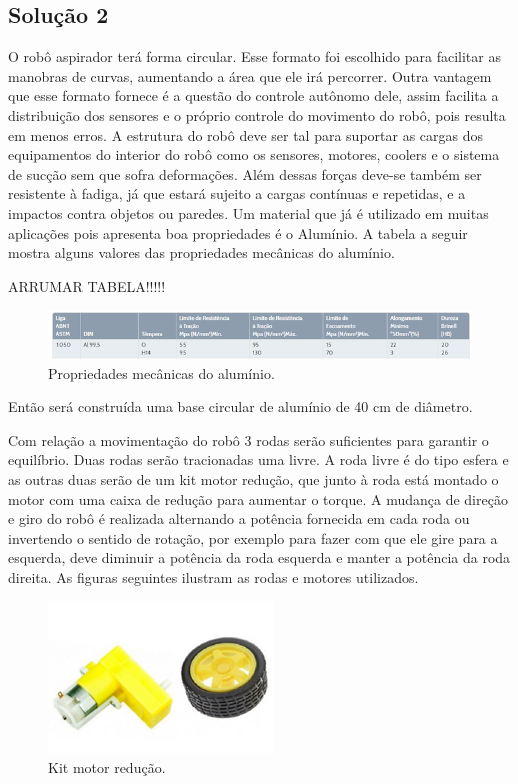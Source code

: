 		\subsection{Solução 2} %
		\label{sub:solução_2}
			
			O robô aspirador terá forma circular. Esse formato foi escolhido para facilitar as manobras de curvas, aumentando a área que ele irá percorrer. Outra vantagem que esse formato fornece é a questão do controle autônomo dele, assim facilita a distribuição dos sensores e o próprio controle do movimento do robô, pois resulta em menos erros. A estrutura do robô deve ser tal para suportar as cargas dos equipamentos do interior do robô como os sensores, motores, coolers e o sistema de sucção sem que sofra deformações. Além dessas forças deve-se também ser resistente à fadiga, já que estará sujeito a cargas contínuas e repetidas, e a impactos contra objetos ou paredes. Um material que já é utilizado em muitas aplicações pois apresenta boa propriedades é o Alumínio. A tabela a seguir mostra alguns valores das propriedades mecânicas do alumínio.


			ARRUMAR TABELA!!!!!
			\begin{figure}[H]
				\centering
				\includegraphics[scale=0.8]{figuras/tabela_estru1.png}
				\caption{Propriedades mecânicas do alumínio.}
				\label{img:rascunho1}
			\end{figure}

			Então será construída uma base circular de alumínio de 40 cm de diâmetro.

        	Com relação a movimentação do robô 3 rodas serão suficientes para garantir o equilíbrio. Duas rodas serão tracionadas uma livre.  A roda livre é do tipo esfera e as outras duas serão de um kit motor redução, que junto à roda está montado o motor com uma caixa de redução para aumentar o torque. A mudança de direção e giro do robô é realizada alternando a potência fornecida em cada roda ou invertendo o sentido de rotação, por exemplo para fazer com que ele gire para a esquerda, deve diminuir a potência da roda esquerda e manter a potência da roda direita. As figuras seguintes ilustram as rodas e motores utilizados.

        	\begin{figure}[H]
				\centering
				\includegraphics[scale=0.7]{figuras/motor_roda.png}
				\caption{Kit motor redução.}
				\label{img:kit_motor}
			\end{figure}

